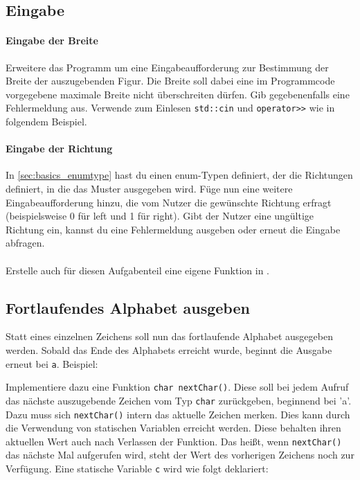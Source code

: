 \subsection{Eingabe}
\paragraph{Eingabe der Breite}
Erweitere das Programm um eine Eingabeaufforderung zur Bestimmung der Breite der auszugebenden Figur.
Die Breite soll dabei eine im Programmcode vorgegebene maximale Breite nicht überschreiten dürfen. 
Gib gegebenenfalls eine Fehlermeldung aus.
Verwende zum Einlesen \lstinline{std::cin} und \lstinline{operator>>} wie in folgendem Beispiel.

  
\paragraph{Eingabe der Richtung}
In \ref{sec:basics_enumtype} hast du einen enum-Typen definiert, der die Richtungen definiert, in die das Muster ausgegeben wird. 
Füge nun eine weitere Eingabeaufforderung hinzu, die vom Nutzer die gewünschte Richtung erfragt (beispielsweise 0 für left und 1 für right). 
Gibt der Nutzer eine ungültige Richtung ein, kannst du eine Fehlermeldung ausgeben oder erneut die Eingabe abfragen.\\
\\
Erstelle auch für diesen Aufgabenteil eine eigene Funktion in .

\subsection{Fortlaufendes Alphabet ausgeben}
Statt eines einzelnen Zeichens soll nun das fortlaufende Alphabet ausgegeben werden.
Sobald das Ende des Alphabets erreicht wurde, beginnt die Ausgabe erneut bei \texttt{a}.
Beispiel:


Implementiere dazu eine Funktion \lstinline{char nextChar()}.
Diese soll bei jedem Aufruf das nächste auszugebende Zeichen vom Typ \lstinline{char} zurückgeben, beginnend bei 'a'.
Dazu muss sich \lstinline{nextChar()} intern das aktuelle Zeichen merken.
Dies kann durch die Verwendung von statischen Variablen erreicht werden. 
Diese behalten ihren aktuellen Wert auch nach Verlassen der Funktion. 
Das heißt, wenn \lstinline{nextChar()} das nächste Mal aufgerufen wird, steht der Wert des vorherigen Zeichens noch zur Verfügung.
Eine statische Variable \lstinline{c} wird wie folgt deklariert:

